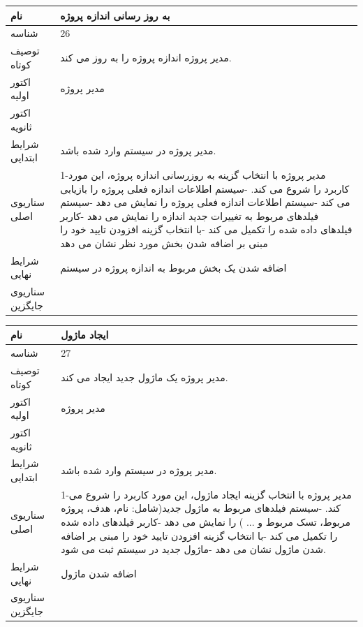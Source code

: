 \vspace{2cm}

\begin{tabular}{|p{2cm}|p{10cm}|}
\hline
نام
&
به روز رسانی اندازه پروژه
\\
\hline
شناسه
&
26
\\
\hline
توصیف کوتاه
&
مدیر پروژه اندازه پروژه را به روز می کند. 
\\
\hline
اکتور اولیه
&
مدیر پروژه
\\
\hline
اکتور ثانویه
&

\\
\hline
شرایط ابتدایی
&
مدیر پروژه در سیستم وارد شده باشد.
\\
\hline
سناریوی اصلی
&
1-مدیر پروژه با انتخاب گزینه به روزرسانی اندازه پروژه، این مورد کاربرد را شروع می کند.
\newline
2-سیستم اطلاعات اندازه فعلی پروژه را بازیابی می کند
\newline
3-سیستم اطلاعات اندازه فعلی پروژه را نمایش می دهد
\newline
4-سیستم فیلدهای مربوط به  تغییرات جدید اندازه را نمایش می دهد
\newline
5-کاربر فیلدهای داده شده را تکمیل می کند
\newline
6-با انتخاب گزینه افزودن تایید خود را مبنی بر اضافه شدن بخش مورد نظر نشان می دهد
\\
\hline
شرایط نهایی
&
اضافه شدن یک بخش مربوط به اندازه پروژه در سیستم
\\
\hline
سناریوی جایگزین
&

\\
\hline
\end{tabular}


\vspace{2cm}


\begin{tabular}{|p{2cm}|p{10cm}|}
\hline
نام
&
ایجاد ماژول
\\
\hline
شناسه
&
27
\\
\hline
توصیف کوتاه
&
مدیر پروژه یک ماژول جدید ایجاد می کند. 
\\
\hline
اکتور اولیه
&
مدیر پروژه
\\
\hline
اکتور ثانویه
&

\\
\hline
شرایط ابتدایی
&
مدیر پروژه در سیستم وارد شده باشد.
\\
\hline
سناریوی اصلی
&
1-مدیر پروژه با انتخاب گزینه ایجاد ماژول، این مورد کاربرد را شروع می کند.
\newline
2-سیستم فیلدهای مربوط به ماژول جدید(شامل: نام، هدف، پروژه مربوط، تسک مربوط و ... ) را نمایش می دهد
\newline
3-کاربر فیلدهای داده شده را تکمیل می کند
\newline
4-با انتخاب گزینه افزودن تایید خود را مبنی بر اضافه شدن ماژول نشان می دهد
\newline
5-ماژول جدید در سیستم ثبت می شود.
\\
\hline
شرایط نهایی
&
اضافه شدن ماژول
\\
\hline
سناریوی جایگزین
&

\\
\hline
\end{tabular}

